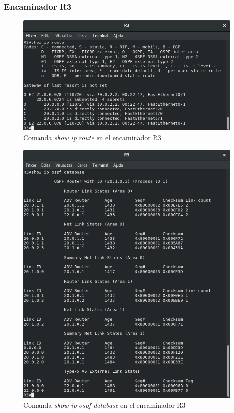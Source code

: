 \documentclass[10pt]{article}
\begin{document}
\subsubsection{Encaminador R3}
\begin{figure}[H]
\begin{center}
\includegraphics[scale=0.5]{Images/ospf-R3-route.png}
\caption{Comanda \textit{show ip route} en el encaminador R3}
\end{center}
\end{figure}
\begin{figure}[H]
\begin{center}
\includegraphics[scale=0.4]{Images/ospf-R3-database.png}
\caption{Comanda \textit{show ip ospf database} en el encaminador R3}
\end{center}
\end{figure}
\end{document}
